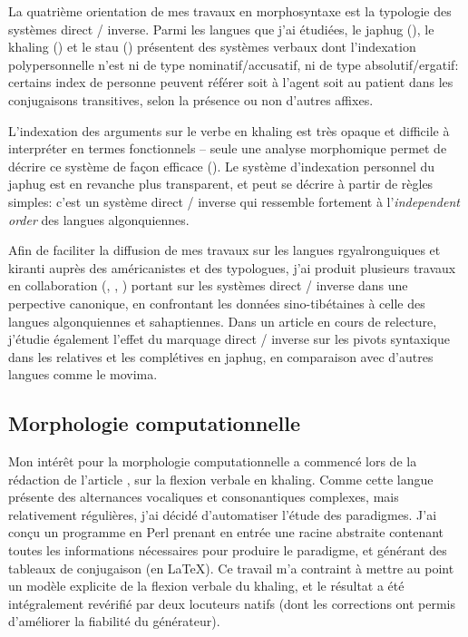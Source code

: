\documentclass[oldfontcommands,oneside,a4paper,11pt]{article}
\begin{document}
 La quatrième orientation de mes travaux en morphosyntaxe est la typologie des systèmes direct / inverse. Parmi les langues que j'ai étudiées, le japhug (\citealt{jacques10inverse}), le khaling (\citealt{jacques12khaling}) et le stau  (\citealt{jacques14rtau}) présentent des systèmes verbaux dont l'indexation polypersonnelle n'est ni de type nominatif/accusatif, ni de type absolutif/ergatif: certains index de personne  peuvent référer soit à l'agent soit au patient dans les conjugaisons transitives, selon la présence ou non d'autres affixes.
 
 L'indexation des arguments sur le verbe en khaling est très opaque et difficile à interpréter en termes fonctionnels -- seule une analyse morphomique permet de décrire ce système de façon efficace (\citealt{walther14compactness}). Le système d'indexation personnel du  japhug est en revanche plus transparent, et peut se décrire à partir de règles simples: c'est un système direct / inverse qui ressemble fortement à l'\textit{independent order} des langues algonquiennes.  
 
Afin de faciliter la diffusion de mes travaux sur les langues rgyalronguiques et kiranti auprès des américanistes et des typologues, j'ai produit  plusieurs travaux en collaboration (\citealt{jacques14inverse}, \citealt{jacques15directionality},   \citealt{walther14inv.canon}) portant sur les systèmes direct / inverse dans une perpective canonique, en confrontant les données sino-tibétaines à celle des langues  algonquiennes et sahaptiennes.   Dans un article en cours de relecture, j'étudie également l'effet du marquage direct / inverse sur les pivots syntaxique dans les relatives et les complétives en japhug, en comparaison avec d'autres langues comme le movima.
  
\subsection{Morphologie computationnelle}  \label{sec:morpho}
Mon intérêt pour la morphologie computationnelle a commencé lors de la rédaction de l'article \citet{jacques12khaling}, sur la flexion verbale en khaling. Comme cette langue présente des alternances vocaliques et consonantiques complexes, mais relativement régulières, j'ai décidé d'automatiser l'étude des paradigmes. J'ai conçu un programme en Perl prenant en entrée une racine abstraite contenant toutes les informations nécessaires pour produire le paradigme, et générant des tableaux de conjugaison (en  \LaTeX{}). Ce travail m'a contraint à mettre au point un modèle explicite de la flexion verbale du khaling, et le résultat a été intégralement revérifié par deux locuteurs natifs (dont les corrections ont permis d'améliorer la fiabilité du générateur).
\end{document}
